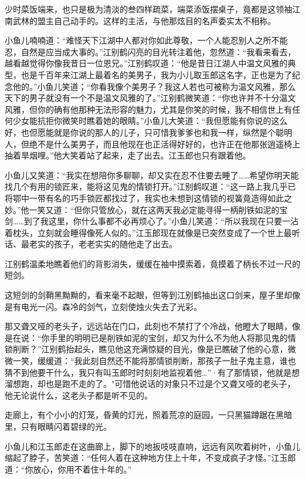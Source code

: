 \documentclass[12pt,oneside]{book}
\begin{document}
少时菜饭端来，也只是极为清淡的叁四样疏菜，端菜添饭摆桌子，竟都是这领袖江南武林的盟主自己动手的。这样的主活，与他那炫目的名声委实太不相称。

小鱼儿喃喃道：``难怪天下江湖中人都对你如此尊敬，一个人能忍别人之所不能忍，自然是应当成大事的。''江别鹤闪亮的目光转注着他，忽然道：``我看来看去，越看越觉得你像我昔日一位恩兄。''江别鹤叹道：``他是昔日江湖人中温文风雅的典型，也是千百年来江湖上最着名的美男子，我为小儿取玉郎这名字，正也是为了纪念他的。''小鱼儿笑道；``你看我像个美男子？我这人若也可被称为温文风雅，那么天下的男子就没有一个不是温文风雅的了。''江别鹤微笑道：``你也许并不十分温文风雅，但你的确有他那种无法形容的魅力，尤其是你笑的时候，我不相信世上有任何少女能抗拒你微笑时瞧着她的眼睛。''小鱼儿大笑道：``我但愿能有你说的这么好，也但愿能就是你说的那人的儿子，只可惜我爹爹也和我一样，纵然是个聪明人，但绝不是什么美男子，而且他现在也正活得好好的，也许正在他那张逍遥椅上抽着旱烟哩。''他大笑着站了起来，走了出去。江玉郎也只有跟着他。

小鱼儿又笑道：``我实在想陪你多聊聊，却又实在忍不住要去睡了\ldots\ldots 希望你明天能找几个有用的锁匠来，能将这见鬼的情锁打开。''江别鹤叹道：``这一路上我几乎已将鄂中一带有名的巧手锁匠都找过了，我实也未想到这情锁的视簧竟造得如此之妙。''他一笑又道：``但你只管放心，就在这两天我必定能寻得一柄削铁如泥的宝剑\ldots\ldots 到了我这里，你什么事都不必再烦心了。''小鱼儿笑道：``所以我现在只要一沾着枕头，立刻就会睡得像死人似的。''江玉郎现在就像是已突然变成了一个世上最听话、最老实的孩子，老老实实的随他走了出去。

江别鹤温柔地瞧着他们的背影消失，缓缓在袖中摸索着，竟摸着了柄长不过一尺的短剑。

这短剑的剑鞘黑黝黝的，看来毫不起眼，但等到江别鹤抽出这口剑来，屋子里却像是有电光一闪。森冷的剑气，立刻使烛火失去了光彩。

那又聋又哑的老头子，远远站在门口，此刻也不禁打了个冷战，他瞪大了眼睛，像是在说：``你手里的明明已是削铁如泥的宝剑，却又为什么不为他人将那见鬼的情锁削断？''江别鹤抬起头，瞧见他这充满惊疑的目光，像是已瞧破了他的心意，微微一笑，缓缓道：``我此刻自然还不能将那情锁削断，那孩子一肚子鬼主意，谁也猜不到他要干什么，我只有叫玉郎时时刻刻地监视着他\ldots{}''·有了那情锁，他就是想溜想跑，却也是跑不走的了。"可惜他说话的对象只不过是个又聋又哑的老头子，他无论说什么，这老头子都是听不见的。

走廊上，有个小小的灯笼，昏黄的灯光，照着荒凉的庭园，一只黑猫蹲踞在黑暗里，只有眼睛闪着碧绿的光。

小鱼儿和江玉郎走在这曲廊上，脚下的地扳吱吱直响，远远有风吹着树叶，小鱼儿缩起了脖子，苦笑道：``任何人着在这种地方住上十年，不变成疯子才怪。''江玉郎道：``你放心，你用不着住十年的。''
\end{document}
